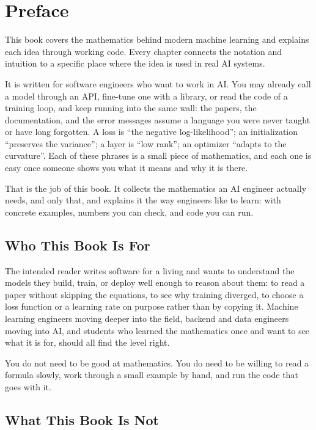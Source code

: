 \chapter{Preface}

This book covers the mathematics behind modern machine learning and
explains each idea through working code. Every chapter connects the
notation and intuition to a specific place where the idea is used in real
AI systems.

It is written for software engineers who want to work in AI. You may
already call a model through an API, fine-tune one with a library, or
read the code of a training loop, and keep running into the same wall:
the papers, the documentation, and the error messages assume a language
you were never taught or have long forgotten. A loss is ``the negative
log-likelihood''; an initialization ``preserves the variance''; a layer
is ``low rank''; an optimizer ``adapts to the curvature''. Each of these
phrases is a small piece of mathematics, and each one is easy once
someone shows you what it means and why it is there.

That is the job of this book. It collects the mathematics an AI engineer
actually needs, and only that, and explains it the way engineers like
to learn: with concrete examples, numbers you can check, and code you
can run.

\section*{Who This Book Is For}

The intended reader writes software for a living and wants to
understand the models they build, train, or deploy well enough to
reason about them: to read a paper without skipping the equations, to
see why training diverged, to choose a loss function or a learning rate
on purpose rather than by copying it. Machine learning engineers moving
deeper into the field, backend and data engineers moving into AI, and
students who learned the mathematics once and want to see what it is
for, should all find the level right.

You do not need to be good at mathematics. You do need to be willing to
read a formula slowly, work through a small example by hand, and run
the code that goes with it.

\section*{What This Book Is Not}

